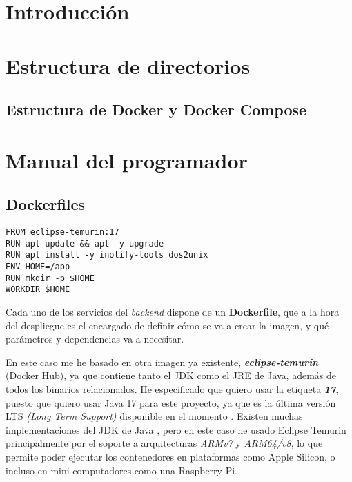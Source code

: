 
\section{Introducción}

\section{Estructura de directorios}

\subsection{Estructura de Docker y Docker Compose}


\section{Manual del programador}

\subsection{Dockerfiles}

\begin{lstlisting}
FROM eclipse-temurin:17
RUN apt update && apt -y upgrade
RUN apt install -y inotify-tools dos2unix
ENV HOME=/app
RUN mkdir -p $HOME
WORKDIR $HOME
\end{lstlisting}

Cada uno de los servicios del \textit{backend} dispone de un \textbf{Dockerfile}, que a la hora del despliegue es el encargado de definir cómo se va a crear la imagen, y qué parámetros y dependencias va a necesitar.

En este caso me he basado en otra imagen ya existente, \textit{\textbf{eclipse-temurin}} (\href{https://hub.docker.com/layers/library/eclipse-temurin/17/images/sha256-b0faf02bf7acfc65be1c2d0a291140300bd129620f145bf1013a1da748295d0c?context=explore}{Docker Hub}), ya que contiene tanto el JDK como el JRE de Java, además de todos los binarios relacionados. He especificado que quiero usar la etiqueta \textit{\textbf{17}}, puesto que quiero usar Java 17 para este proyecto, ya que es la última versión LTS \textit{(Long Term Support)} disponible en el momento \cite{java:releases}. Existen muchas implementaciones del JDK de Java \cite{foojay:java-jdks}, pero en este caso he usado Eclipse Temurin principalmente por el soporte a arquitecturas \textit{ARMv7} y \textit{ARM64/v8}, lo que permite poder ejecutar los contenedores en plataformas como Apple Silicon, o incluso en mini-computadores como una Raspberry Pi.

